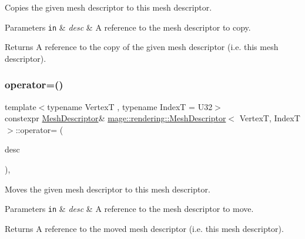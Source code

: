 Copies the given mesh descriptor to this mesh descriptor.


\begin{DoxyParams}[1]{Parameters}
\mbox{\tt in}  & {\em desc} & A reference to the mesh descriptor to copy. \\
\hline
\end{DoxyParams}
\begin{DoxyReturn}{Returns}
A reference to the copy of the given mesh descriptor (i.\+e. this mesh descriptor). 
\end{DoxyReturn}
\mbox{\label{classmage_1_1rendering_1_1_mesh_descriptor_a044577019dcdb37ed0d1d919d9d33887}} 
\subsubsection{\texorpdfstring{operator=()}{operator=()}\hspace{0.1cm}{\footnotesize\ttfamily [2/2]}}
{\footnotesize\ttfamily template$<$typename VertexT , typename IndexT  = U32$>$ \\
constexpr \mbox{\hyperlink{classmage_1_1rendering_1_1_mesh_descriptor}{Mesh\+Descriptor}}\& \mbox{\hyperlink{classmage_1_1rendering_1_1_mesh_descriptor}{mage\+::rendering\+::\+Mesh\+Descriptor}}$<$ VertexT, IndexT $>$\+::operator= (\begin{DoxyParamCaption}\item[{\mbox{\hyperlink{classmage_1_1rendering_1_1_mesh_descriptor}{Mesh\+Descriptor}}$<$ VertexT, IndexT $>$ \&\&}]{desc }\end{DoxyParamCaption})\hspace{0.3cm}{\ttfamily [default]}, {\ttfamily [noexcept]}}

Moves the given mesh descriptor to this mesh descriptor.


\begin{DoxyParams}[1]{Parameters}
\mbox{\tt in}  & {\em desc} & A reference to the mesh descriptor to move. \\
\hline
\end{DoxyParams}
\begin{DoxyReturn}{Returns}
A reference to the moved mesh descriptor (i.\+e. this mesh descriptor). 
\end{DoxyReturn}


